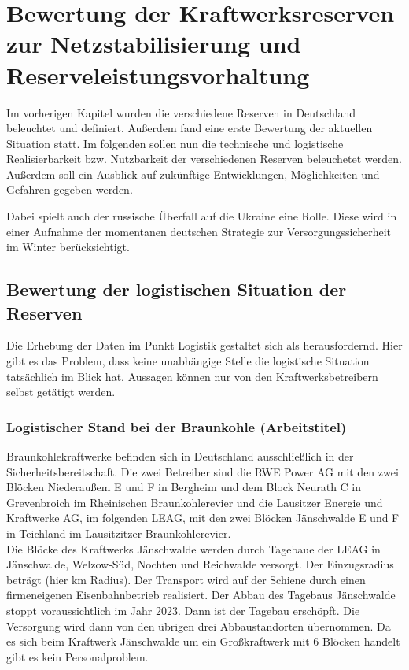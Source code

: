 \section{Bewertung der Kraftwerksreserven zur Netzstabilisierung und Reserveleistungsvorhaltung}

Im vorherigen Kapitel wurden die verschiedene Reserven in Deutschland beleuchtet und definiert. Außerdem fand eine erste Bewertung der aktuellen Situation statt. Im folgenden sollen nun die technische und logistische Realisierbarkeit bzw. Nutzbarkeit der verschiedenen Reserven beleuchetet werden. Außerdem soll ein Ausblick auf zukünftige Entwicklungen, Möglichkeiten und Gefahren gegeben werden.

Dabei spielt auch der russische Überfall auf die Ukraine eine Rolle. Diese wird in einer Aufnahme der momentanen deutschen Strategie zur Versorgungssicherheit im Winter berücksichtigt.

	\subsection{Bewertung der logistischen Situation der Reserven}
	Die Erhebung der Daten im Punkt Logistik gestaltet sich als herausfordernd. Hier gibt es das Problem, dass keine unabhängige Stelle die logistische Situation tatsächlich im Blick hat. Aussagen können nur von den Kraftwerksbetreibern selbst getätigt werden.
	
		\subsubsection{Logistischer Stand bei der Braunkohle (Arbeitstitel)} \label{sect: Braunkohle}
		Braunkohlekraftwerke befinden sich in Deutschland ausschließlich in der Sicherheitsbereitschaft. Die zwei Betreiber sind die RWE Power AG mit den zwei Blöcken Niederaußem E und F in Bergheim und dem Block Neurath C in Grevenbroich im Rheinischen Braunkohlerevier und die Lausitzer Energie und Kraftwerke AG, im folgenden LEAG, mit den zwei Blöcken Jänschwalde E und F in Teichland im Lausitzitzer Braunkohlerevier. \\
		
		Die Blöcke des Kraftwerks Jänschwalde werden durch Tagebaue der LEAG in Jänschwalde, Welzow-Süd, Nochten und Reichwalde versorgt. Der Einzugsradius beträgt (hier km Radius). Der Transport wird auf der Schiene durch einen firmeneigenen Eisenbahnbetrieb realisiert. Der Abbau des Tagebaus Jänschwalde stoppt voraussichtlich im Jahr 2023. Dann ist der Tagebau erschöpft. Die Versorgung wird dann von den übrigen drei Abbaustandorten übernommen.
		Da es sich beim Kraftwerk Jänschwalde um ein Großkraftwerk mit 6 Blöcken handelt gibt es kein Personalproblem.\\
		

